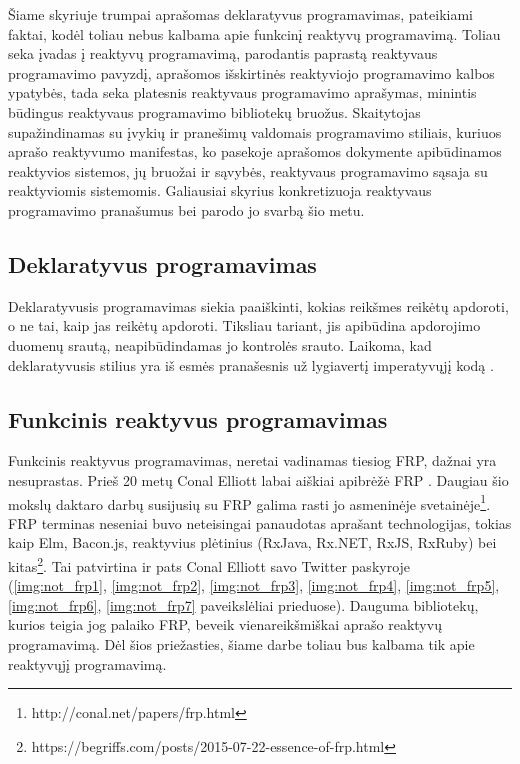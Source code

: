 Šiame skyriuje trumpai aprašomas deklaratyvus programavimas, pateikiami faktai, kodėl toliau nebus kalbama apie funkcinį reaktyvų programavimą. Toliau seka įvadas į reaktyvų programavimą, parodantis paprastą reaktyvaus programavimo pavyzdį, aprašomos išskirtinės reaktyviojo programavimo kalbos ypatybės, tada seka platesnis reaktyvaus programavimo aprašymas, minintis būdingus reaktyvaus programavimo bibliotekų bruožus. Skaitytojas supažindinamas su įvykių ir pranešimų valdomais programavimo stiliais, kuriuos aprašo reaktyvumo manifestas, ko pasekoje aprašomos dokymente apibūdinamos reaktyvios sistemos, jų bruožai ir sąvybės, reaktyvaus programavimo sąsaja su reaktyviomis sistemomis. Galiausiai skyrius konkretizuoja reaktyvaus programavimo pranašumus bei parodo jo svarbą šio metu.

\subsection{Deklaratyvus programavimas}

Deklaratyvusis programavimas siekia paaiškinti, kokias reikšmes reikėtų apdoroti, o ne tai, kaip jas reikėtų apdoroti. Tiksliau tariant, jis apibūdina apdorojimo duomenų srautą, neapibūdindamas jo kontrolės srauto. Laikoma, kad deklaratyvusis stilius yra iš esmės pranašesnis už lygiavertį imperatyvųjį kodą \cite{DeclarativeProgramming}.

\subsection{Funkcinis reaktyvus programavimas}

Funkcinis reaktyvus programavimas, neretai vadinamas tiesiog FRP, dažnai yra nesuprastas. Prieš 20 metų Conal Elliott labai aiškiai apibrėžė FRP \cite{ElliottHudak97:Fran}. Daugiau šio mokslų daktaro darbų susijusių su FRP galima rasti jo asmeninėje svetainėje\footnote{http://conal.net/papers/frp.html}. FRP terminas neseniai buvo neteisingai panaudotas aprašant technologijas, tokias kaip Elm, Bacon.js, reaktyvius plėtinius (RxJava, Rx.NET, RxJS, RxRuby) bei kitas\footnote{https://begriffs.com/posts/2015-07-22-essence-of-frp.html}. Tai patvirtina ir pats Conal Elliott savo Twitter paskyroje (\ref{img:not_frp1}, \ref{img:not_frp2}, \ref{img:not_frp3}, \ref{img:not_frp4}, \ref{img:not_frp5}, \ref{img:not_frp6}, \ref{img:not_frp7} paveikslėliai prieduose). Dauguma bibliotekų, kurios teigia jog palaiko FRP, beveik vienareikšmiškai aprašo reaktyvų programavimą. Dėl šios priežasties, šiame darbe toliau bus kalbama tik apie reaktyvųjį programavimą.

